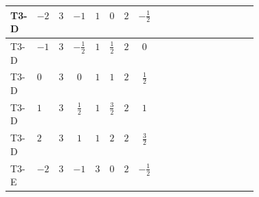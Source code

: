 \documentclass[8pt]{article}
\begin{document}
\begin{landscape}
\begin{longtable}{@{}llcccccc >{\raggedright\arraybackslash}p{0.21\linewidth} >{\raggedright\arraybackslash}p{0.21\linewidth}@{}}
\midrule
T3-D & $-2$ & $3$ & $-1$ & $1$ & $0$ & $2$ & $-\frac{1}{2}$ & \scriptsize\adjustbox{max width=\linewidth}{$\begin{gathered} 6 C_{5} Y_d Y_d^\dagger\end{gathered}$} & \scriptsize\adjustbox{max width=\linewidth}{$\begin{gathered} 6 C_{5} Y_u Y_u^\dagger\end{gathered}$} \\
\midrule
T3-D & $-1$ & $3$ & $-\frac{1}{2}$ & $1$ & $\frac{1}{2}$ & $2$ & $0$ & \scriptsize\adjustbox{max width=\linewidth}{$\begin{gathered} 6 C_{5} Y_d Y_d^\dagger\end{gathered}$} & \scriptsize\adjustbox{max width=\linewidth}{$\begin{gathered} 6 C_{5} Y_u Y_u^\dagger\end{gathered}$} \\
\midrule
T3-D & $0$ & $3$ & $0$ & $1$ & $1$ & $2$ & $\frac{1}{2}$ & \scriptsize\adjustbox{max width=\linewidth}{$\begin{gathered} 6 C_{5} Y_d Y_d^\dagger\end{gathered}$} & \scriptsize\adjustbox{max width=\linewidth}{$\begin{gathered} 6 C_{5} Y_u Y_u^\dagger\end{gathered}$} \\
\midrule
T3-D & $1$ & $3$ & $\frac{1}{2}$ & $1$ & $\frac{3}{2}$ & $2$ & $1$ & \scriptsize\adjustbox{max width=\linewidth}{$\begin{gathered} 6 C_{5} Y_d Y_d^\dagger\end{gathered}$} & \scriptsize\adjustbox{max width=\linewidth}{$\begin{gathered} 6 C_{5} Y_u Y_u^\dagger\end{gathered}$} \\
\midrule
T3-D & $2$ & $3$ & $1$ & $1$ & $2$ & $2$ & $\frac{3}{2}$ & \scriptsize\adjustbox{max width=\linewidth}{$\begin{gathered} 6 C_{5} Y_d Y_d^\dagger\end{gathered}$} & \scriptsize\adjustbox{max width=\linewidth}{$\begin{gathered} 6 C_{5} Y_u Y_u^\dagger\end{gathered}$} \\
\midrule
T3-E & $-2$ & $3$ & $-1$ & $3$ & $0$ & $2$ & $-\frac{1}{2}$ & \scriptsize\adjustbox{max width=\linewidth}{$\begin{gathered} 6 C_{5} Y_d Y_d^\dagger\end{gathered}$} & \scriptsize\adjustbox{max width=\linewidth}{$\begin{gathered} 6 C_{5} Y_u Y_u^\dagger\end{gathered}$} \\

\end{longtable}
\end{landscape}
\end{document}
